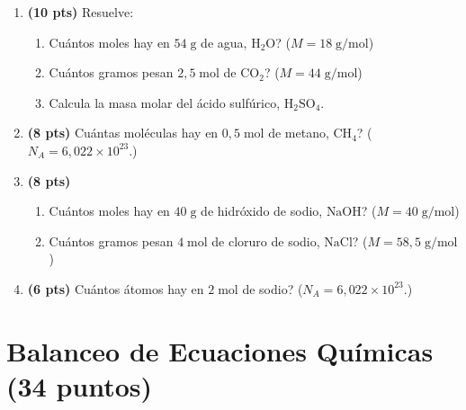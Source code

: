 \documentclass[12pt, letterpaper]{article}
\begin{document}
\begin{enumerate}[leftmargin=*]
  \item \textbf{(10 pts)} Resuelve:
        \begin{enumerate}[label=\alph*)]
          \item \textquestiondown Cuántos moles hay en $54\;\text{g}$ de agua, $\text{H}_2\text{O}$? ($M = 18\;\text{g/mol}$)
          \item \textquestiondown Cuántos gramos pesan $2{,}5\;\text{mol}$ de $\text{CO}_2$? ($M = 44\;\text{g/mol}$)
          \item Calcula la masa molar del ácido sulfúrico, $\text{H}_2\text{SO}_4$.
        \end{enumerate}

  \item \textbf{(8 pts)} \textquestiondown Cuántas moléculas hay en $0{,}5\;\text{mol}$ de metano, $\text{CH}_4$? ($N_A = 6{,}022 \times 10^{23}$.)

  \item \textbf{(8 pts)}
        \begin{enumerate}[label=\alph*)]
          \item \textquestiondown Cuántos moles hay en $40\;\text{g}$ de hidróxido de sodio, $\text{NaOH}$? ($M = 40\;\text{g/mol}$)
          \item \textquestiondown Cuántos gramos pesan $4\;\text{mol}$ de cloruro de sodio, $\text{NaCl}$? ($M = 58{,}5\;\text{g/mol}$)
        \end{enumerate}

  \item \textbf{(6 pts)} \textquestiondown Cuántos átomos hay en $2\;\text{mol}$ de sodio? ($N_A = 6{,}022 \times 10^{23}$.)
\end{enumerate}

\newpage

\section{Balanceo de Ecuaciones Químicas (34 puntos)}
\end{document}
